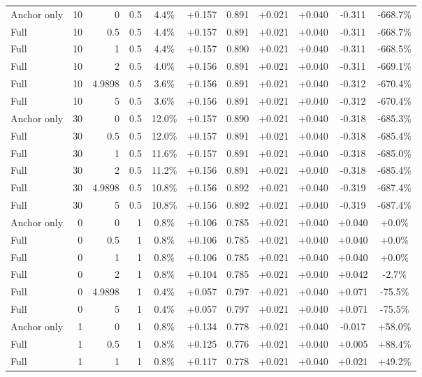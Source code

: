 \begin{table}[htbp]
\begin{tabular}{lrrrccccccc}
Anchor only & 10 & 0 & 0.5 & 4.4\% & +0.157 & 0.891 & +0.021 & +0.040 & -0.311 & -668.7\% \\
Full & 10 & 0.5 & 0.5 & 4.4\% & +0.157 & 0.891 & +0.021 & +0.040 & -0.311 & -668.7\% \\
Full & 10 & 1 & 0.5 & 4.4\% & +0.157 & 0.890 & +0.021 & +0.040 & -0.311 & -668.5\% \\
Full & 10 & 2 & 0.5 & 4.0\% & +0.156 & 0.891 & +0.021 & +0.040 & -0.311 & -669.1\% \\
Full & 10 & 4.9898 & 0.5 & 3.6\% & +0.156 & 0.891 & +0.021 & +0.040 & -0.312 & -670.4\% \\
Full & 10 & 5 & 0.5 & 3.6\% & +0.156 & 0.891 & +0.021 & +0.040 & -0.312 & -670.4\% \\
Anchor only & 30 & 0 & 0.5 & 12.0\% & +0.157 & 0.890 & +0.021 & +0.040 & -0.318 & -685.3\% \\
Full & 30 & 0.5 & 0.5 & 12.0\% & +0.157 & 0.891 & +0.021 & +0.040 & -0.318 & -685.4\% \\
Full & 30 & 1 & 0.5 & 11.6\% & +0.157 & 0.891 & +0.021 & +0.040 & -0.318 & -685.0\% \\
Full & 30 & 2 & 0.5 & 11.2\% & +0.156 & 0.891 & +0.021 & +0.040 & -0.318 & -685.4\% \\
Full & 30 & 4.9898 & 0.5 & 10.8\% & +0.156 & 0.892 & +0.021 & +0.040 & -0.319 & -687.4\% \\
Full & 30 & 5 & 0.5 & 10.8\% & +0.156 & 0.892 & +0.021 & +0.040 & -0.319 & -687.4\% \\
Anchor only & 0 & 0 & 1 & 0.8\% & +0.106 & 0.785 & +0.021 & +0.040 & +0.040 & +0.0\% \\
Full & 0 & 0.5 & 1 & 0.8\% & +0.106 & 0.785 & +0.021 & +0.040 & +0.040 & +0.0\% \\
Full & 0 & 1 & 1 & 0.8\% & +0.106 & 0.785 & +0.021 & +0.040 & +0.040 & +0.0\% \\
Full & 0 & 2 & 1 & 0.8\% & +0.104 & 0.785 & +0.021 & +0.040 & +0.042 & -2.7\% \\
Full & 0 & 4.9898 & 1 & 0.4\% & +0.057 & 0.797 & +0.021 & +0.040 & +0.071 & -75.5\% \\
Full & 0 & 5 & 1 & 0.4\% & +0.057 & 0.797 & +0.021 & +0.040 & +0.071 & -75.5\% \\
Anchor only & 1 & 0 & 1 & 0.8\% & +0.134 & 0.778 & +0.021 & +0.040 & -0.017 & +58.0\% \\
Full & 1 & 0.5 & 1 & 0.8\% & +0.125 & 0.776 & +0.021 & +0.040 & +0.005 & +88.4\% \\
Full & 1 & 1 & 1 & 0.8\% & +0.117 & 0.778 & +0.021 & +0.040 & +0.021 & +49.2\% \\

\end{tabular}
\end{table}
